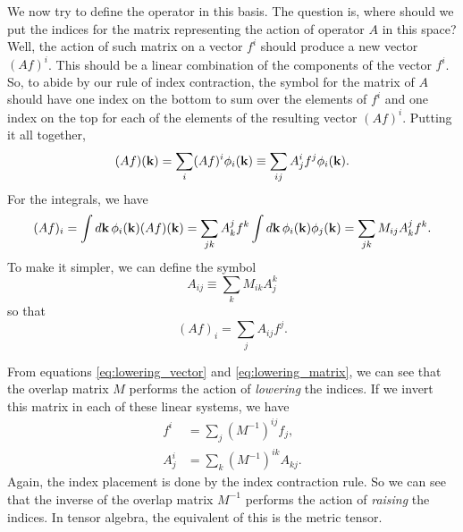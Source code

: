 \documentclass[12pt]{article}
\begin{document}
We now try to define the operator in this basis. The question is, where should we put the indices
for the matrix representing the action of operator $A$ in this space? Well, the action of such
matrix on a vector $f^i$ should produce a new vector $(Af)^i$. This should be a linear combination
of the components of the vector $f^i$. So, to abide by our rule of index contraction, the symbol for
the matrix of $A$ should have one index on the bottom to sum over the elements of $f^i$ and one index
on the top for each of the elements of the resulting vector $(Af)^i$. Putting it all together,
\begin{equation}
    (Af)(\vb{k}) = \sum_i (Af)^i \phi_i(\vb{k}) \equiv \sum_{ij} A^i_j f^j \phi_i(\vb{k}).
\end{equation}
For the integrals, we have
\begin{equation}
    (Af)_i = \int\dd{\vb{k}} \phi_i(\vb{k}) (Af)(\vb{k}) = \sum_{jk} A^j_kf^k
    \int\dd{\vb{k}} \phi_i(\vb{k})\phi_j(\vb{k}) = \sum_{jk} M_{ij} A^j_k f^k.
    \label{eq:integral}
\end{equation}
To make it simpler, we can define the symbol
\begin{equation}
    A_{ij} \equiv \sum_k M_{ik} A^k_j
    \label{eq:lowering_matrix}
\end{equation}
so that
\begin{equation}
    (Af)_i = \sum_j A_{ij} f^j.
    \label{eq:integral_matrix}
\end{equation}

From equations \eqref{eq:lowering_vector} and \eqref{eq:lowering_matrix}, we can see that the
overlap matrix $M$ performs the action of \emph{lowering} the indices. If we invert this matrix
in each of these linear systems, we have
\begin{align}
    f^i &= \sum_j (M^{-1})^{ij} f_j, \\
    A^i_j &= \sum_k (M^{-1})^{ik} A_{kj}.
\end{align}
Again, the index placement is done by the index contraction rule. So we can see that the inverse of
the overlap matrix $M^{-1}$ performs the action of \emph{raising} the indices. In tensor algebra,
the equivalent of this is the metric tensor.
\end{document}
